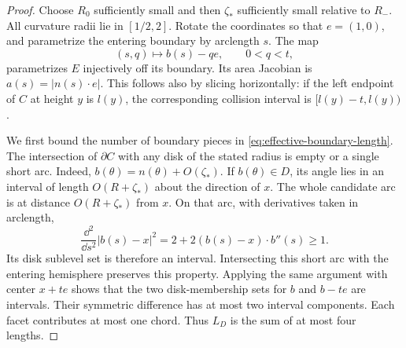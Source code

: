 \begin{proof}
Choose $R_0$ sufficiently small and then $\zeta_*$ sufficiently small
relative to $R_-$. All curvature radii lie in $[1/2,2]$. Rotate the
coordinates so that $e=(1,0)$, and parametrize the entering boundary by
arclength $s$. The map
\[
               (s,q)\longmapsto b(s)-qe,\qquad 0<q<t,
\]
parametrizes $E$ injectively off its boundary. Its area Jacobian is
$a(s)=|n(s)\cdot e|$. This follows also by slicing horizontally:
if the left endpoint of $C$ at height $y$ is $l(y)$, the corresponding
collision interval is $[l(y)-t,l(y))$.

We first bound the number of boundary pieces in
\eqref{eq:effective-boundary-length}. The intersection of $\partial C$
with any disk of the stated radius is empty or a single short arc.
Indeed, $b(\theta)=n(\theta)+O(\zeta_*)$. If $b(\theta)\in D$, its
angle lies in an interval of length $O(R+\zeta_*)$ about the direction
of $x$. The whole candidate arc is at distance $O(R+\zeta_*)$ from
$x$. On that arc, with derivatives taken in arclength,
\[
 \frac{\dd^2}{\dd s^2}|b(s)-x|^2
       =2+2(b(s)-x)\cdot b''(s)\ge1.
\]
Its disk sublevel set is therefore an interval. Intersecting this short
arc with the entering hemisphere preserves this property. Applying the
same argument with center $x+te$ shows that the two disk-membership sets
for $b$ and $b-te$ are intervals. Their symmetric difference has at most
two interval components. Each facet contributes at most one chord.
Thus $L_D$ is the sum of at most four lengths.


\end{proof}

